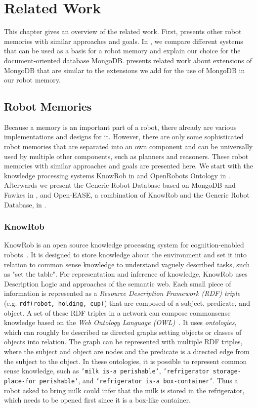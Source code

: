 \chapter{Related Work}
\label{chap:related}
This chapter gives an overview of the related work. First,
 presents other robot memories with similar
approaches and goals. In , we compare
different systems that can be used as a basis for a robot memory and
explain our choice for the document-oriented database
MongoDB.  presents related work about
extensions of MongoDB that are similar to the extensions we add for
the use of MongoDB in our robot memory.

\section{Robot Memories}
\label{sec:rw-robmems}
Because a memory is an important part of a robot, there already are
various implementations and designs for it. However, there are only
some sophisticated robot memories that are separated into an own
component and can be universally used by multiple other components,
such as planners and reasoners. These robot memories with similar
approaches and goals are presented here. We start with the knowledge
processing systems KnowRob in  and OpenRobots
Ontology in . Afterwards we present the Generic Robot
Database based on MongoDB and Fawkes in ,
and Open-EASE, a combination of KnowRob and the Generic Robot
Database, in .

\subsection{KnowRob}
\label{sec:knowrob}
KnowRob is an open source knowledge processing system for
cognition-enabled robots~\cite{KnowRob,KnowRob-Representation}. It is
designed to store knowledge about the environment and set it into
relation to common sense knowledge to understand vaguely described
tasks, such as "set the table". For representation and inference of
knowledge, KnowRob uses Description Logic and approaches of the
semantic web.  Each small piece of information is represented as a
\emph{Resource Description Framework (RDF) triple} (e.g. \texttt{rdf(robot,
holding, cup)}) that are composed of a subject, predicate, and
object. A set of these RDF triples in a network can compose
commonsense knowledge based on the \emph{Web Ontology Language
  (OWL)}~\cite{owl}. It uses \emph{ontologies}, which can roughly be described as
directed graphs setting objects or classes of objects into
relation. The graph can be represented with multiple RDF triples,
where the subject and object are nodes and the predicate is a directed
edge from the subject to the object. In these ontologies, it is
possible to represent common sense knowledge, such as \texttt{'milk is-a
perishable'}, \texttt{'refrigerator storage-place-for perishable'}, and
\texttt{'refrigerator is-a box-container'}. Thus a robot asked to bring milk
could infer that the milk is stored in the refrigerator, which needs
to be opened first since it is a box-like container.


